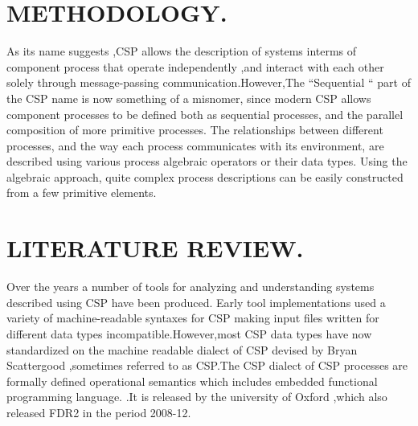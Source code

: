 \documentclass{article}
\begin{document}
\section{METHODOLOGY.}
As  its name suggests ,CSP allows the description of systems interms of component process that operate independently ,and interact with each other solely through message-passing communication.However,The “Sequential “ part of the CSP name is now something of a misnomer, since modern  CSP allows component processes to be defined both as sequential processes, and the parallel composition of more primitive processes. The relationships between different processes, and the way each process communicates with its environment, are described using various process algebraic operators or their data types. Using the algebraic approach, quite complex process descriptions can be easily constructed from a few primitive elements.
\section{LITERATURE REVIEW.}
Over the years a number of tools for analyzing and understanding systems described using CSP have been produced. Early tool implementations used a variety of machine-readable syntaxes for CSP making input files written for different data types incompatible.However,most CSP data types have now standardized on the machine readable dialect of CSP devised by Bryan Scattergood ,sometimes referred to as CSP.The CSP dialect of CSP processes are formally defined operational semantics  which includes embedded functional programming language.
 .It is released by the university of Oxford ,which also released FDR2 in the period 2008-12.

\begin{thebibliography}{1}

\end{thebibliography}
\end{document}
